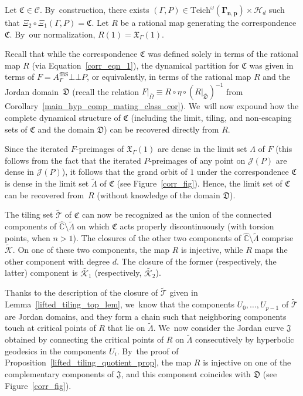\documentclass[JEP,XML,SOM,Unicode,NoFloatCountersInSection,published]{cedram}
\theoremstyle{definition}
\theoremstyle{remark}
\newcommand{\C}{\mathbb{C}}
\newcommand{\cC}{\mathcal{C}}
\newcommand{\mate}{\bot \!\! \! {\bot}}
\begin{document}
\label{corr_mating_struct_intrinsic_subsec}

Let $\mathfrak{C}\in\cC$. By~construction, there exists $(\Gamma,P)\in \mathrm{Teich}^\omega(\pmb{\Gamma_{n,p}})\times\mathcal{H}_{d}$ such that $\Xi_2\circ\Xi_1(\Gamma,P)=\mathfrak{C}$. Let $R$ be a rational map generating the correspondence $\mathfrak{C}$. By~our normalization, $R(1)=\mathfrak{X}_\Gamma(1)$.

Recall that while the correspondence $\mathfrak{C}$ was defined solely in terms of the rational map $R$ (via Equation~\eqref{corr_eqn_1}), the dynamical partition for $\mathfrak{C}$ was given in terms of $F=A_{\Gamma}^{\mathrm{fBS}}\mate P$, or equivalently, in terms of the rational map $R$ and the Jordan domain~$\mathfrak{D}$ (recall the relation $F\vert_{\overline{\Omega}}\equiv R\circ\eta\circ (R\vert_{\overline{\mathfrak{D}}})^{-1}$ from Corollary~\ref{main_hyp_comp_mating_class_cor}). We~will now expound how the complete dynamical structure of $\mathfrak{C}$ (including the limit, tiling, and non-escaping sets of $\mathfrak{C}$ and the domain $\mathfrak{D}$) can be recovered directly from $R$.

Since the iterated $F$-preimages of $\mathfrak{X}_\Gamma(1)$ are dense in the limit set $\Lambda$ of $F$ (this follows from the fact that the iterated $P$-preimages of any point on $\mathcal{J}(P)$ are dense in $\mathcal{J}(P)$), it follows that the grand orbit of $1$ under the correspondence $\mathfrak{C}$ is dense in the limit set $\widetilde{\Lambda}$ of $\mathfrak{C}$ (see Figure~\ref{corr_fig}). Hence, the limit set of $\mathfrak{C}$ can be recovered from~$R$ (without knowledge of the domain $\mathfrak{D}$).

The tiling set $\widetilde{\mathcal{T}}$ of $\mathfrak{C}$ can now be recognized as the union of the connected components of $\widehat{\C}\setminus\widetilde{\Lambda}$ on which $\mathfrak{C}$ acts properly discontinuously (with torsion points, when $n>1$). The closures of the other two components of $\widehat{\C}\setminus\widetilde{\Lambda}$ comprise $\widetilde{\mathcal{K}}$. On one of these two components, the map $R$ is injective, while $R$ maps the other component with degree $d$. The closure of the former (respectively, the latter) component is $\widetilde{\mathcal{K}_1}$ (respectively, $\widetilde{\mathcal{K}_2}$).\enlargethispage{\baselineskip}%

Thanks to the description of the closure of $\widetilde{\mathcal{T}}$ given in Lemma~\ref{lifted_tiling_top_lem}, we~know that the components $U_0,\dots,U_{p-1}$ of $\widetilde{\mathcal{T}}$ are Jordan domains, and they form a chain such that neighboring components touch at critical points of $R$ that lie on $\widetilde{\Lambda}$. We~now consider the Jordan curve $\mathfrak{J}$ obtained by connecting the critical points of $R$ on $\widetilde{\Lambda}$ consecutively by hyperbolic geodesics in the components $U_i$. By~the proof of Proposition~\ref{lifted_tiling_quotient_prop}, the map $R$ is injective on one of the complementary components of $\mathfrak{J}$, and this component coincides with $\mathfrak{D}$ (see Figure~\ref{corr_fig}).
\end{document}
